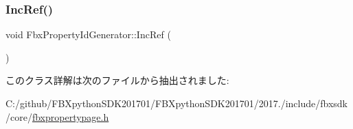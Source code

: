 \mbox{\label{class_fbx_property_id_generator_ac1834015b7a1fa1fe47ebf93737b03e0}} 
\subsubsection{\texorpdfstring{Inc\+Ref()}{IncRef()}}
{\footnotesize\ttfamily void Fbx\+Property\+Id\+Generator\+::\+Inc\+Ref (\begin{DoxyParamCaption}{ }\end{DoxyParamCaption})}



このクラス詳解は次のファイルから抽出されました\+:\begin{DoxyCompactItemize}
\item 
C\+:/github/\+F\+B\+Xpython\+S\+D\+K201701/\+F\+B\+Xpython\+S\+D\+K201701/2017./include/fbxsdk/core/\hyperlink{fbxpropertypage_8h}{fbxpropertypage.\+h}\end{DoxyCompactItemize}
